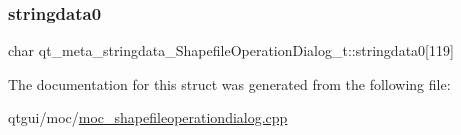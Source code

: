 \subsubsection{\texorpdfstring{stringdata0}{stringdata0}}
{\footnotesize\ttfamily char qt\+\_\+meta\+\_\+stringdata\+\_\+\+Shapefile\+Operation\+Dialog\+\_\+t\+::stringdata0\mbox{[}119\mbox{]}}



The documentation for this struct was generated from the following file\+:\begin{DoxyCompactItemize}
\item 
qtgui/moc/\mbox{\hyperlink{moc__shapefileoperationdialog_8cpp}{moc\+\_\+shapefileoperationdialog.\+cpp}}\end{DoxyCompactItemize}

